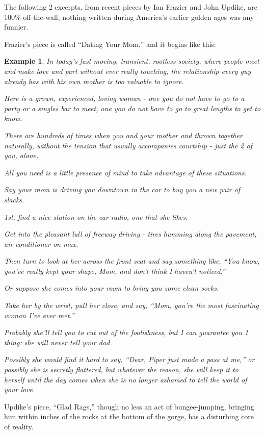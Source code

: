 \documentclass{book}
\numberwithin{equation}{section}
\newtheorem{example}{Example}[chapter]
\begin{document}
The following 2 excerpts, from recent pieces by Ian Frazier and John Updike, are 100\% off-the-wall; nothing written during America's earlier golden ages was any funnier.

Frazier's piece is called ``Dating Your Mom,'' and it begins like this:
\begin{example}
    In today's fast-moving, transient, rootless society, where people meet and make love and part without ever really touching, the relationship every guy already has with his own mother is too valuable to ignore.
    
    Here is a grown, experienced, loving woman - one you do not have to go to a party or a singles bar to meet, one you do not have to go to great lengths to get to know.
    
    There are hundreds of times when you and your mother and thrown together naturally, without the tension that usually accompanies courtship - just the 2 of you, alone.
    
    All you need is a little presence of mind to take advantage of these situations.
    
    Say your mom is driving you downtown in the car to buy you a new pair of slacks.
    
    1st, find a nice station on the car radio, one that she likes.
    
    Get into the pleasant lull of freeway driving - tires humming along the pavement, air conditioner on max.
    
    Then turn to look at her across the front seat and say something like, ``You know, you've really kept your shape, Mom, and don't think I haven't noticed.''
    
    Or suppose she comes into your room to bring you some clean socks.
    
    Take her by the wrist, pull her close, and say, ``Mom, you're the most fascinating woman I've ever met.''
    
    Probably she'll tell you to cut out of the foolishness, but I can guarantee you 1 thing: she will never tell your dad.
    
    Possibly she would find it hard to say, ``Dear, Piper just made a pass at me,'' or possibly she is secretly flattered, but whatever the reason, she will keep it to herself until the day comes when she is no longer ashamed to tell the world of your love.
\end{example}
Updike's piece, ``Glad Rags,'' though no less an act of bungee-jumping, bringing him within inches of the rocks at the bottom of the gorge, has a disturbing core of reality.
\end{document}
